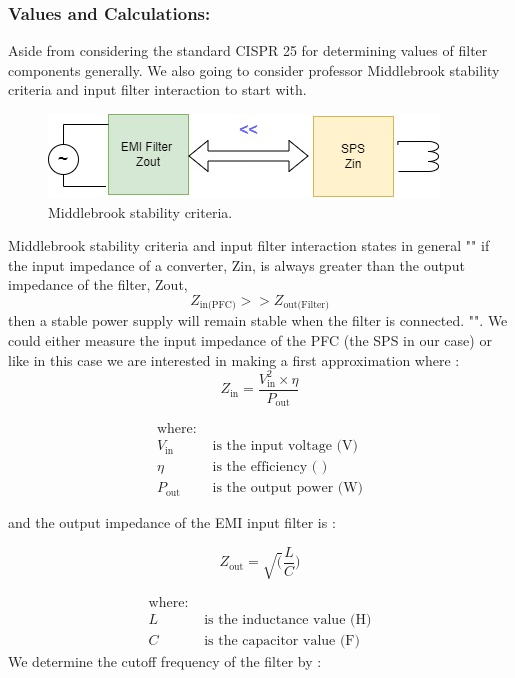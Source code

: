 \documentclass{article}
\begin{document}
\subsubsection{Values and Calculations:}
Aside from considering the standard CISPR 25 for determining values of filter components generally. We also going to consider professor Middlebrook stability criteria and input filter interaction to start with.


\begin{figure}[htbp]
    \centering
    \includegraphics[width=\textwidth]{Middlebrook stability criteria.jpg}
    \caption{Middlebrook stability criteria.}
    \label{fig:Middlebrook stability criteria.}
\end{figure}
Middlebrook stability criteria and input filter interaction states in general  ""  if the input impedance of a converter, Zin, is always greater than the output impedance of the filter, Zout, \[ Z_{\text{in(PFC)}} >> Z_{\text{out(Filter)}} \] then a stable power supply will remain stable when the filter is connected. "".
We could either measure the input impedance of the PFC (the SPS in our case) or like in this case we are interested in making a first approximation where : 
\[
Z_{\text{in}} =  \frac{V_{\text{in}}^2\times\eta}{P_{\text{out}}}
\]

\begin{align*}
\text{where:} \\
 V_{\text{in}} &\text{ is the input voltage (V)} \\
\eta &\text{ is the efficiency ( ) } \\
 P_{\text{out}} &\text{ is the output power (W}\text{)}
\end{align*}

and the output impedance of the EMI input filter is :

\[
Z_{\text{out}} =  \sqrt(\frac{L}{C})
\]

\begin{align*}
\text{where:} \\
 L &\text{ is the inductance value (H)} \\
 C &\text{ is the capacitor value (F}\text{)}
\end{align*}
We determine the cutoff frequency of the filter by :
\end{document}
